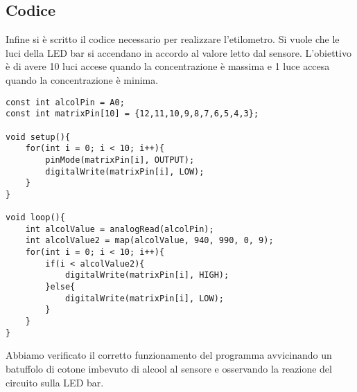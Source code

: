 \subsection{Codice}
Infine si è scritto il codice necessario per realizzare l’etilometro. Si vuole che le luci della LED bar si accendano in accordo al valore letto dal sensore. L’obiettivo è di avere 10 luci accese quando la concentrazione è massima e 1 luce accesa quando la concentrazione è minima.
\begin{lstlisting}[frame=single, language=Arduino]
const int alcolPin = A0;
const int matrixPin[10] = {12,11,10,9,8,7,6,5,4,3};

void setup(){
    for(int i = 0; i < 10; i++){
        pinMode(matrixPin[i], OUTPUT);
        digitalWrite(matrixPin[i], LOW);
    }
}

void loop(){
    int alcolValue = analogRead(alcolPin);
    int alcolValue2 = map(alcolValue, 940, 990, 0, 9);
    for(int i = 0; i < 10; i++){
        if(i < alcolValue2){
            digitalWrite(matrixPin[i], HIGH);
        }else{
            digitalWrite(matrixPin[i], LOW);
        }
    }
}
\end{lstlisting}
Abbiamo verificato il corretto funzionamento del programma avvicinando un batuffolo di cotone imbevuto di alcool al sensore e osservando la reazione del circuito sulla LED bar.